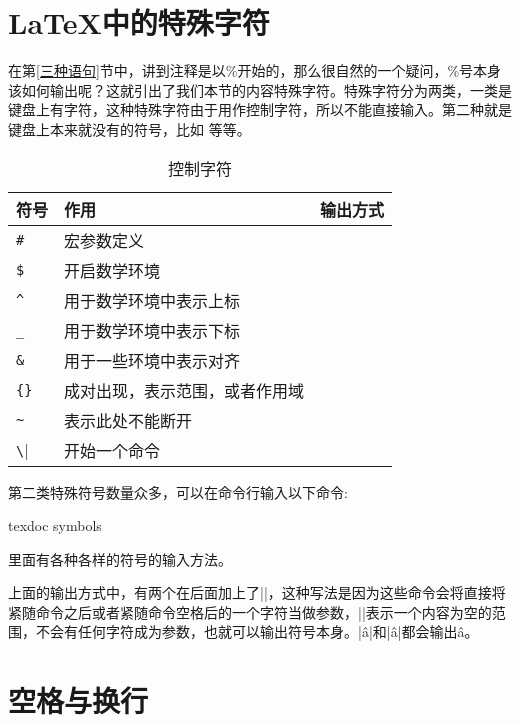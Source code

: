 \section{\LaTeX 中的特殊字符}
在第\ref{三种语句}节中，讲到注释是以\%开始的，那么很自然的一个疑问，\%号本身该如何输出呢？这就引出了我们本节的内容特殊字符。特殊字符分为两类，一类是键盘上有字符，这种特殊字符由于用作控制字符，所以不能直接输入。第二种就是键盘上本来就没有的符号，比如\alpha\beta
等等。
\begin{table}[ht]
	\centering
	\begin{tabular}{lll} \toprule
		符号      & 作用                           & 输出方式                   \\ \midrule
		\verb|#|  & 宏参数定义                     & \texinline{\#}             \\
		\verb|$|  & 开启数学环境                   & \texinline{\$}             \\
		\verb|^|  & 用于数学环境中表示上标         & \texinline{\^{}}           \\
		\verb|_|  & 用于数学环境中表示下标         & \texinline{\_}             \\
		\verb|&|  & 用于一些环境中表示对齐         & \texinline{\&}             \\
		\verb|{}| & 成对出现，表示范围，或者作用域 & \texinline{\{ \}}          \\
		\verb|~|  & 表示此处不能断开               & \texinline{\~{}}           \\
		\verb|\|  & 开始一个命令                   & \texinline{\textbackslash} \\ \bottomrule
	\end{tabular}
	\caption{控制字符}
\end{table}

\pagebreak
第二类特殊符号数量众多，可以在命令行输入以下命令:
\begin{shellcmd}
	texdoc symbols
\end{shellcmd}

里面有各种各样的符号的输入方法。

上面的输出方式中，有两个在后面加上了\texinline|{}|，这种写法是因为这些命令会将直接将紧随命令之后或者紧随命令空格后的一个字符当做参数，\texinline|{}|表示一个内容为空的范围，不会有任何字符成为参数，也就可以输出符号本身。\texinline|\^ a|和\texinline|\^a|都会输出\^a。

\section{空格与换行}
